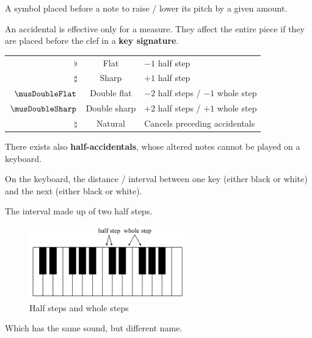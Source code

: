 \begin{definition}[Accidental]
    A symbol placed before a note to raise / lower its pitch by a given amount.
\end{definition}

An accidental is effective only for a measure. They affect the entire piece if they are placed before the clef in a \textbf{key signature}.
\begin{center}
    \begin{tabular}{r|c|l}
        $\flat{}$ & Flat & $-1$ half step \\
        $\sharp{}$ & Sharp & $+1$ half step \\
        $\musDoubleFlat$ & Double flat & $-2$ half steps / $-1$ whole step \\
        $\musDoubleSharp$ & Double sharp & $+2$ half steps / $+1$ whole step \\
        $\natural{}$ & Natural & Cancels preceding accidentals \\
    \end{tabular}
\end{center}
There exists also \textbf{half-accidentals}, whose altered notes cannot be played on a keyboard.

\begin{definition}
    On the keyboard, the distance / interval between one key (either black or white) and the next (either black or white).
\end{definition}

\begin{definition}
    The interval made up of two half steps.
\end{definition}

\begin{figure}[h]
    \begin{center}
        \includegraphics[width=0.6\textwidth]{img/halfstep}
        \caption{Half steps and whole steps}
    \end{center}
\end{figure}

\begin{definition}[Enharmonic]
    Which has the same sound, but different name.
\end{definition}

